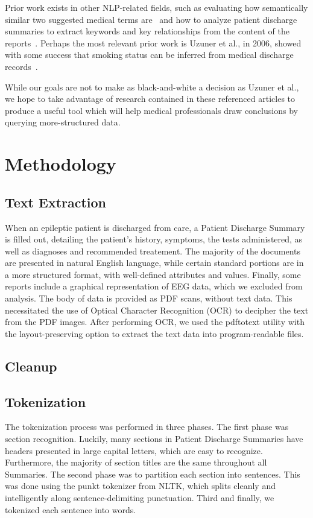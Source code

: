 \documentclass{acm_proc_article-sp}
\begin{document}
Prior work exists in other NLP-related fields, such as evaluating how semantically similar 
two suggested medical terms are~\cite{Pedersen2007288} and how to analyze patient
discharge summaries to extract keywords and key relationships from the content of the
reports~\cite{soderland}. Perhaps the most relevant prior work is Uzuner et al., in 2006,
showed with some success that smoking status can be inferred from medical discharge 
records~\cite{Uzuner200814}.

While our goals are not to make as black-and-white a decision as Uzuner et al., we hope to take 
advantage of research contained in these referenced articles to produce a useful tool which will
help medical professionals draw conclusions by querying more-structured data.

\section{Methodology}
\subsection{Text Extraction}
When an epileptic patient is discharged from care, a Patient Discharge Summary is
filled out, detailing the patient's history, symptoms, the tests administered, as
well as diagnoses and recommended treatement. The majority of the documents are
presented in natural English language, while certain standard portions are in a
more structured format, with well-defined attributes and values. Finally, some
reports include a graphical representation of EEG data, which we excluded from analysis.
The body of data is provided as PDF scans, without text data. This necessitated the use
of Optical Character Recognition (OCR) to decipher the text from the PDF images.
After performing OCR, we used the pdftotext utility with the layout-preserving option
to extract the text data into program-readable files.

\subsection{Cleanup}
\subsection{Tokenization}
The tokenization process was performed in three phases. The first phase was section
recognition. Luckily, many sections in Patient Discharge Summaries have headers presented
in large capital letters, which are easy to recognize. Furthermore, the majority of
section titles are the same throughout all Summaries. The second phase was to partition
each section into sentences. This was done using the punkt tokenizer from NLTK,
which splits cleanly and intelligently along sentence-delimiting punctuation.
Third and finally, we tokenized each sentence into words.
\end{document}
